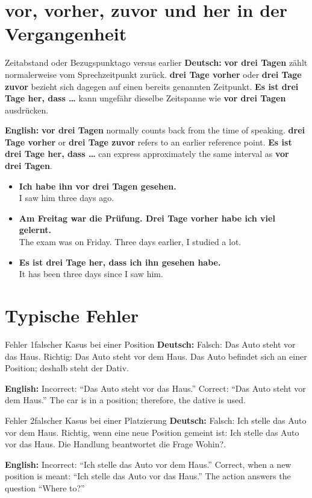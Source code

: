 \documentclass[a4paper,11pt]{article}
\newcommand{\GermanText}[1]{\textbf{Deutsch: }#1\par}
\newcommand{\EnglishText}[1]{{\small\color{SoftGray}\textbf{English: }#1\par}}
\newcommand{\ExampleItem}[2]{\item \textbf{#1}\\{\small\color{SoftGray}#2}}
\begin{document}
    \section{vor, vorher, zuvor und her in der Vergangenheit}
        \begin{grammarentry}{Zeitabstand oder Bezugspunkt}{ago versus earlier}
            \GermanText{\textbf{vor drei Tagen} zählt normalerweise vom Sprechzeitpunkt zurück. \textbf{drei Tage vorher} oder \textbf{drei Tage zuvor} bezieht sich dagegen auf einen bereits genannten Zeitpunkt. \textbf{Es ist drei Tage her, dass \ldots{}} kann ungefähr dieselbe Zeitspanne wie \textbf{vor drei Tagen} ausdrücken.}
            \EnglishText{\textbf{vor drei Tagen} normally counts back from the time of speaking. \textbf{drei Tage vorher} or \textbf{drei Tage zuvor} refers to an earlier reference point. \textbf{Es ist drei Tage her, dass \ldots{}} can express approximately the same interval as \textbf{vor drei Tagen}.}
        \end{grammarentry}
        \begin{exbox}
            \begin{itemize}
                \ExampleItem{Ich habe ihn vor drei Tagen gesehen.}{I saw him three days ago.}
                \ExampleItem{Am Freitag war die Prüfung. Drei Tage vorher habe ich viel gelernt.}{The exam was on Friday. Three days earlier, I studied a lot.}
                \ExampleItem{Es ist drei Tage her, dass ich ihn gesehen habe.}{It has been three days since I saw him.}
            \end{itemize}
        \end{exbox}
    \section{Typische Fehler}

        \begin{grammarentry}{Fehler 1}{falscher Kasus bei einer Position}
            \GermanText{Falsch: \glqq Das Auto steht vor das Haus.\grqq{} Richtig: \glqq Das Auto steht vor dem Haus.\grqq{} Das Auto befindet sich an einer Position; deshalb steht der Dativ.}
            \EnglishText{Incorrect: ``Das Auto steht vor das Haus.'' Correct: ``Das Auto steht vor dem Haus.'' The car is in a position; therefore, the dative is used.}
        \end{grammarentry}

        \begin{grammarentry}{Fehler 2}{falscher Kasus bei einer Platzierung}
            \GermanText{Falsch: \glqq Ich stelle das Auto vor dem Haus.\grqq{} Richtig, wenn eine neue Position gemeint ist: \glqq Ich stelle das Auto vor das Haus.\grqq{} Die Handlung beantwortet die Frage \glqq Wohin?\grqq.}
            \EnglishText{Incorrect: ``Ich stelle das Auto vor dem Haus.'' Correct, when a new position is meant: ``Ich stelle das Auto vor das Haus.'' The action answers the question ``Where to?''}
        \end{grammarentry}
\end{document}
